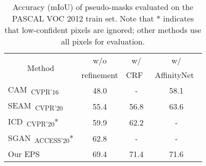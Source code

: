 \begin{table}[]
\centering
{\small
\begin{tabular}{@{}lccc@{}}
\toprule
\multicolumn{1}{c}{\multirow{2}{*}{Method}}         & w/o           & w/ &                                  w/ \\
                                                    & refinement    & CRF~\cite{krahenbuhl2011efficient}    & AffinityNet~\cite{ahn2018learning}    \\ \midrule
\multicolumn{1}{l}{CAM~\cite{zhou2016learning}\textsubscript{CVPR'16}}     & 48.0          & -                                     & 58.1                                  \\
\multicolumn{1}{l}{SEAM~\cite{wang2020self}\textsubscript{CVPR'20}}        & 55.4          & 56.8                                  & 63.6                                  \\
\multicolumn{1}{l}{ICD~\cite{chen2020boundary}\textsubscript{CVPR'20}*}     & 59.9          & 62.2                                  & -                                     \\
\multicolumn{1}{l}{SGAN~\cite{yao2020saliency}\textsubscript{ACCESS'20}*}     & 62.8          & -                                     & -                                     \\
\multicolumn{1}{l}{Our EPS}                            & 69.4          & 71.4                                  & 71.6                                  \\ \bottomrule
\end{tabular}
}
\vspace{2mm}
\caption{Accuracy (mIoU) of pseudo-masks evaluated on the PASCAL VOC 2012 train set. Note that * indicates that low-confident pixels are ignored; other methods use all pixels for evaluation.} \vspace{-3mm}
\label{tab:refinement}
\end{table}